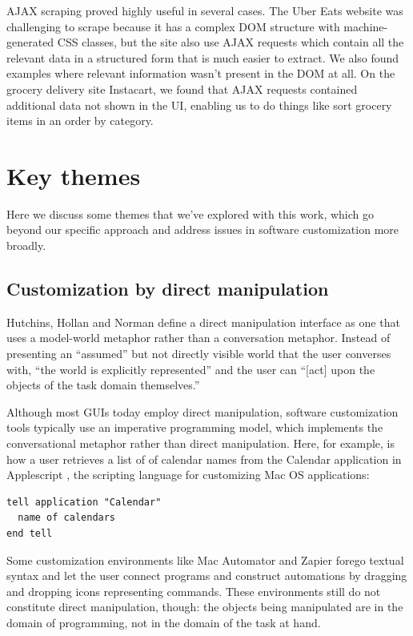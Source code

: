 \documentclass[sigplan,screen,10pt,anonymous,review]{acmart}
\begin{document}
AJAX scraping proved highly useful in several cases. The Uber Eats
website was challenging to scrape because it has a complex DOM structure
with machine-generated CSS classes, but the site also use AJAX requests
which contain all the relevant data in a structured form that is much
easier to extract. We also found examples where relevant information
wasn't present in the DOM at all. On the grocery delivery site
Instacart, we found that AJAX requests contained additional data not
shown in the UI, enabling us to do things like sort grocery items in an
order by category.

\hypertarget{sec:themes}{%
\section{Key themes}\label{sec:themes}}

Here we discuss some themes that we've explored with this work, which go
beyond our specific approach and address issues in software
customization more broadly.

\hypertarget{sec:dm}{%
\subsection{Customization by direct manipulation}\label{sec:dm}}

Hutchins, Hollan and Norman \citep{hutchins1985} define a direct
manipulation interface as one that uses a model-world metaphor rather
than a conversation metaphor. Instead of presenting an ``assumed'' but
not directly visible world that the user converses with, ``the world is
explicitly represented'' and the user can ``{[}act{]} upon the objects
of the task domain themselves.''

Although most GUIs today employ direct manipulation, software
customization tools typically use an imperative programming model, which
implements the conversational metaphor rather than direct manipulation.
Here, for example, is how a user retrieves a list of of calendar names
from the Calendar application in Applescript \citep{cook2007}, the
scripting language for customizing Mac OS applications:

\begin{verbatim}
tell application "Calendar"
  name of calendars
end tell
\end{verbatim}

Some customization environments like Mac Automator and Zapier forego
textual syntax and let the user connect programs and construct
automations by dragging and dropping icons representing commands. These
environments still do not constitute direct manipulation, though: the
objects being manipulated are in the domain of programming, not in the
domain of the task at hand.
\end{document}
